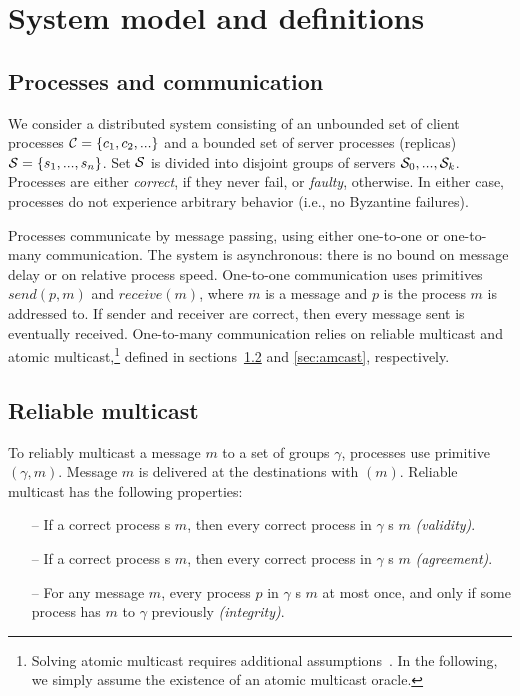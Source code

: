 \section{System model and definitions}
\label{sec:sysmodel}

\subsection{Processes and communication}

We consider a distributed system consisting of an unbounded set of client processes $\mathcal{C} = \{c_1, c_2, ...\}$ and a bounded set of server processes (replicas) $\mathcal{S} = \{s_1, ..., s_n\}$. 
Set $\mathcal{S}$ is divided into disjoint groups of servers $\mathcal{S}_0, ..., \mathcal{S}_k$.
Processes are either \emph{correct}, if they never fail, or \emph{faulty}, otherwise. 
In either case, processes do not experience arbitrary behavior (i.e., no Byzantine failures).

Processes communicate by message passing, using either one-to-one or one-to-many communication.
The system is asynchronous: there is no bound on message delay or on relative process speed.
One-to-one communication uses primitives $send(p,m)$ and $receive(m)$, where $m$ is a message and $p$ is the process $m$ is addressed to. 
If sender and receiver are correct, then every message sent is eventually received. 
%
One-to-many communication relies on reliable multicast and atomic multicast,\footnote{Solving atomic multicast requires additional assumptions~\cite{CT96,FLP85}. In the following, we simply assume the existence of an atomic multicast oracle.}
defined in sections~\ref{sec:rmcast} and \ref{sec:amcast}, respectively.

\subsection{Reliable multicast}
\label{sec:rmcast}

To reliably multicast a message $m$ to a set of groups $\gamma$, processes use primitive \rmcast$(\gamma, m)$.
Message $m$ is delivered at the destinations with \rmdel$(m)$.
Reliable multicast has the following properties:

\begin{itemize}

    \item[--] If a correct process \rmcast{}s $m$, then every correct process in $\gamma$ \rmdel{}s $m$ \emph{(validity)}.
    
    \item[--] If a correct process \rmdel{}s $m$, then every correct process in $\gamma$ \rmdel{}s $m$ \emph{(agreement)}.
    
    \item[--] For any message $m$, every process $p$ in $\gamma$ \rmdel{}s $m$ at most once, and only if some process has \rmcast{} $m$  to $\gamma$ previously \emph{(integrity)}.
    
\end{itemize}

